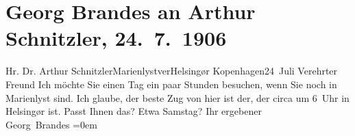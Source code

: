 

         
         \renewcommand{\erwaehntePersonen}{Personen: Georg Brandes}
         \renewcommand{\erwaehnteOrte}{Orte: Helsingør, Kopenhagen, Marienlyst}
         \renewcommand{\erwaehnteWerke}{}
               \section[Georg Brandes an Arthur Schnitzler, 24. 7. 1906]{ Georg Brandes an Arthur Schnitzler, 24. 7. 1906}\nopagebreak{}\rehead{ }\begin{ledgroupsized}[t]{13cm}\normalsize\beginnumbering{} \toendnotes[C]{\smallbreak\pagebreak[2]} 
\pstart{}{\pb}Hr. Dr. Arthur
                  Schnitzler\pend{}\pstart{}Marienlyst\pend{}\pstart{}ver\pend{}\pstart{}Helsingør\pend{}{\bigskip}\pstart
           \raggedleft{}{\pb}Kopenhagen24 Juli\pend
           \pstart{}Verehrter Freund\pend\pstart
           Ich möchte Sie einen Tag ein paar Stunden besuchen, wenn Sie noch in Marienlyst sind. Ich glaube, der beste Zug von
               hier ist der, der circa um 6 Uhr in Helsingør ist. Passt Ihnen das? Etwa Samstag?\pend
           \pstart
           Ihr ergebener{\\[\baselineskip]}\spacefill\mbox{Georg Brandes}\pend
           \leftskip=0em{}
         
         \endnumbering{}\end{ledgroupsized}  \newcommand{\dateiname}{L01615}\newcommand{\titel}{Georg Brandes an Arthur Schnitzler, 24. 7. 1906}\newcommand{\editorInnen}{Martin Anton Müller und Gerd-Hermann Susen}
      